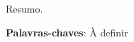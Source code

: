 \begin{resumo}
 Resumo.

 \vspace{\onelineskip}
    
 \noindent
 \textbf{Palavras-chaves}: À definir
\end{resumo}
